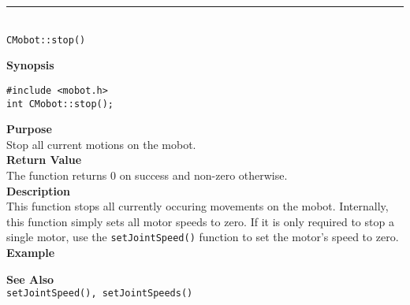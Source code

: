 \noindent
\vspace{5pt}
\rule{4.5in}{0.015in}\\
\noindent
{\LARGE \texttt{CMobot::stop()}}\\
{}

\noindent
{\bf Synopsis}
\vspace{-8pt}
\begin{verbatim}
#include <mobot.h>
int CMobot::stop();
\end{verbatim}

\noindent
{\bf Purpose}\\
Stop all current motions on the mobot.\\

\noindent
{\bf Return Value}\\
The function returns 0 on success and non-zero otherwise.\\

\noindent
{\bf Description}\\
This function stops all currently occuring movements on the mobot. Internally, this function simply sets all motor speeds to zero. If it is only required to stop a single motor, use the 
\texttt{setJointSpeed()} function to set the motor's speed to zero. \\

\noindent
{\bf Example}\\
\noindent

\noindent
{\bf See Also}\\
\texttt{setJointSpeed(), setJointSpeeds()}

